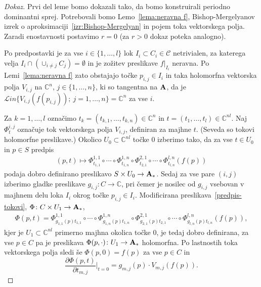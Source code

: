 \documentclass[12pt,a4paper,twoside]{article}
\theoremstyle{definition} %
\newenvironment{dokaz}[1][Dokaz]{\begin{proof}[#1]}{\end{proof}}
\theoremstyle{plain} %
\numberwithin{equation}{section}  %
\newcommand{\C}{\mathbb C}
\begin{document}
\begin{dokaz}
Prvi del leme bomo dokazali tako, da bomo konstruirali periodno dominantni sprej. Potrebovali bomo Lemo~\ref{lema:neravna f}, Bishop-Mergelyanov izrek o aproksimaciji~\ref{izr:Bishop-Mergelyan} in pojem toka vektorskega polja.
Zaradi enostavnosti postavimo $r=0$ (za $r>0$ dokaz poteka analogno).

Po predpostavki je za vse $i \in \{ 1, \dots, l \}$ lok $I_{i} \subset C_{i} \in \mathcal{C}$ netrivialen, za katerega velja $I_{i} \cap (\cup_{i \neq j} C_{j}) = \emptyset$ in je zožitev preslikave $f|_{I_{i}}$ neravna. Po Lemi~\ref{lema:neravna f} zato obstajajo točke $p_{i,j} \in I_{i}$ in taka holomorfna vektorska polja $V_{i,j}$ na $\C^{n}$, $j \in \{1, \dots, n \}$, ki so tangentna na $\textbf{\textup{A}}$, da je $\mathcal{L}in \{ V_{i,j}(f(p_{i,j})) ; \ j = 1, \dots, n \} = \C^{n}$ za vse $i$.

Za $k = 1, \dots , l$ označimo $t_{k} = (t_{k,1}, \dots, t_{k,n}) \in \C^{n}$ in $t = (t_{1}, \dots, t_{l}) \in \C^{nl}$. Naj $\Phi_{t}^{i,j}$ označuje tok vektorskega polja $V_{i,j}$, definiran za majhne $t$. (Seveda so tokovi holomorfne preslikave.)
Okolico $U_{0} \subset \C^{nl}$ točke $0$ izberimo tako, da za vse $t \in U_{0}$ in $p \in S$ predpis
\begin{gather} \label{predpis-tokovi}
(p, t) \mapsto \Phi_{t_{1,1}}^{1,1} \circ \cdots \circ \Phi_{t_{1,n}}^{1,n} \circ \Phi_{t_{2,1}}^{2,1} \circ \cdots \circ \Phi_{t_{l,n}}^{l,n} (f(p))
\end{gather}
podaja dobro definirano preslikavo $S \times U_{0} \to \textbf{\textup{A}}_{*}$.
Sedaj za vse pare $(i,j)$ izberimo gladke preslikave $g_{i,j} \colon C \to \C$, pri čemer je nosilec od $g_{i,j}$ vsebovan v majhnem delu loka $I_{i}$ okrog točke $p_{i,j} \in I_{i}$.
Modificirana preslikava~\eqref{predpis-tokovi}, $\Phi \colon C \times U_{1} \to \textbf{\textup{A}}_{*}$,
\begin{gather} \label{predpis-Phi}
\Phi(p,t) = \Phi_{g_{1,1}(p)t_{1,1}}^{1,1} \circ \cdots \circ \Phi_{g_{1,n}(p)t_{1,n}}^{1,n} \circ \Phi_{g_{2,1}(p)t_{2,1}}^{2,1} \circ \cdots \circ \Phi_{g_{l,n}(p)t_{l,n}}^{l,n} (f(p)),
\end{gather}
kjer je $U_{1} \subset \C^{nl}$ primerno majhna okolica točke $0$, je tedaj dobro definirana, za vse $p \in C$ pa je preslikava $\Phi(p, \cdot) \colon U_{1} \to \textbf{\textup{A}}_{*}$ holomorfna. Po lastnostih toka vektorskega polja sledi še $\Phi(p,0) = f(p)$ za vse $p \in C$ in
\begin{equation} \label{dPhi/dt}
\frac{\partial \Phi(p,t)}{\partial t_{m,j}} \Big|_{t=0} = g_{m,j}(p) \cdot V_{m,j}(f(p)).
\end{equation}


\end{dokaz}
\end{document}
